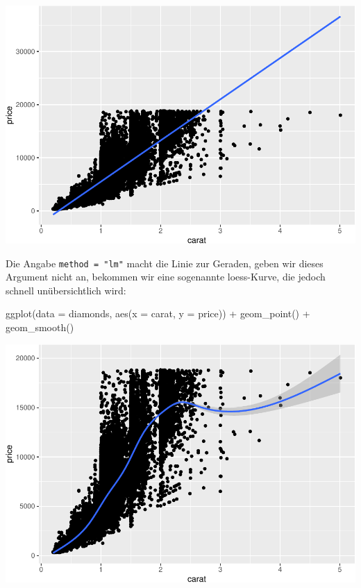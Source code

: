 \documentclass[
]{book}
\newenvironment{Shaded}{\begin{snugshade}}{\end{snugshade}}
\newcommand{\AttributeTok}[1]{\textcolor[rgb]{0.77,0.63,0.00}{#1}}
\newcommand{\FunctionTok}[1]{\textcolor[rgb]{0.00,0.00,0.00}{#1}}
\newcommand{\NormalTok}[1]{#1}
\newcommand{\SpecialCharTok}[1]{\textcolor[rgb]{0.00,0.00,0.00}{#1}}
\begin{document}
\includegraphics{CFH_R_bookdown_files/figure-latex/unnamed-chunk-156-1.pdf}

Die Angabe \texttt{method\ =\ "lm"} macht die Linie zur Geraden, geben wir dieses Argument nicht an, bekommen wir eine sogenannte loess-Kurve, die jedoch schnell unübersichtlich wird:

\begin{Shaded}
\begin{Highlighting}[]
\FunctionTok{ggplot}\NormalTok{(}\AttributeTok{data =}\NormalTok{ diamonds, }\FunctionTok{aes}\NormalTok{(}\AttributeTok{x =}\NormalTok{ carat, }\AttributeTok{y =}\NormalTok{ price)) }\SpecialCharTok{+}
  \FunctionTok{geom\_point}\NormalTok{() }\SpecialCharTok{+}
  \FunctionTok{geom\_smooth}\NormalTok{()}
\end{Highlighting}
\end{Shaded}

\includegraphics{CFH_R_bookdown_files/figure-latex/unnamed-chunk-157-1.pdf}
\end{document}
